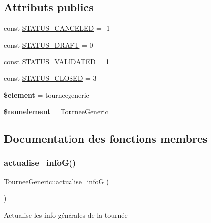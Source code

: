 \subsection*{Attributs publics}
\begin{DoxyCompactItemize}
\item 
const \hyperlink{classTourneeGeneric_a3aedfebda4df17691d9183dbbeadd28a}{S\+T\+A\+T\+U\+S\+\_\+\+C\+A\+N\+C\+E\+L\+ED} = -\/1
\item 
const \hyperlink{classTourneeGeneric_ab9791c4f2cee457bf1971fe344c7e955}{S\+T\+A\+T\+U\+S\+\_\+\+D\+R\+A\+FT} = 0
\item 
const \hyperlink{classTourneeGeneric_a47330ed89033f9602c7c932113233e27}{S\+T\+A\+T\+U\+S\+\_\+\+V\+A\+L\+I\+D\+A\+T\+ED} = 1
\item 
const \hyperlink{classTourneeGeneric_a43ec4261c3697b774ef86110b3d37a2b}{S\+T\+A\+T\+U\+S\+\_\+\+C\+L\+O\+S\+ED} = 3
\item 
\mbox{\label{classTourneeGeneric_accfa2f657dfefd23ffbf7000d5596c80}} 
{\bfseries \$element} = \textquotesingle{}tourneegeneric\textquotesingle{}
\item 
\mbox{\label{classTourneeGeneric_abbd225ce1e88166a462c8a26f9260daf}} 
{\bfseries \$nomelement} = \textquotesingle{}\hyperlink{classTourneeGeneric}{Tournee\+Generic}\textquotesingle{}
\end{DoxyCompactItemize}


\subsection{Documentation des fonctions membres}
\mbox{\label{classTourneeGeneric_a3fc9031d22ff4fb9a9e1707780f670b6}} 
\subsubsection{\texorpdfstring{actualise\+\_\+info\+G()}{actualise\_infoG()}}
{\footnotesize\ttfamily Tournee\+Generic\+::actualise\+\_\+infoG (\begin{DoxyParamCaption}{ }\end{DoxyParamCaption})}

Actualise les info générales de la tournée

